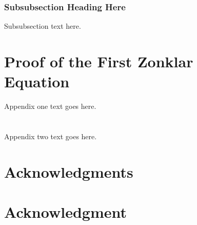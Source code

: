 \documentclass[10pt,journal,compsoc]{IEEEtran}
\begin{document}
\subsubsection{Subsubsection Heading Here}
Subsubsection text here.


%

\appendices
\section{Proof of the First Zonklar Equation}
Appendix one text goes here.

\section{}
Appendix two text goes here.


\ifCLASSOPTIONcompsoc
  \section*{Acknowledgments}
\else
  \section*{Acknowledgment}
\fi
\end{document}

